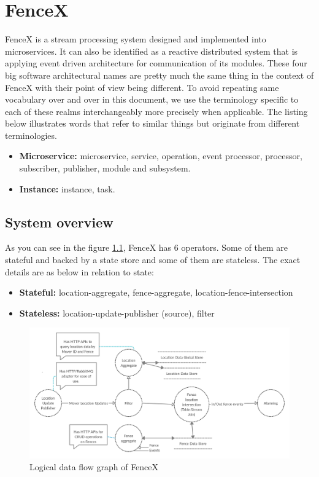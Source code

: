 \documentclass[a4]{report}
\begin{document}
    \chapter{FenceX}
    FenceX is a stream processing system designed and implemented into microservices.
    It can also be identified as a reactive distributed system that is applying event driven architecture for
    communication of its modules.
    These four big software architectural names are pretty much the same thing in the context of FenceX with their
    point of view being different.
    To avoid repeating same vocabulary over and over in this document, we use the terminology specific to each of
    these realms interchangeably more precisely when applicable.
    The listing below illustrates words that refer to similar things but originate from different terminologies.

    \begin{itemize}
        \item \textbf{Microservice:} microservice, service, operation, event processor, processor, subscriber,
        publisher, module and subsystem.
        \item \textbf{Instance:} instance, task.
    \end{itemize}


    \section{System overview}
    As you can see in the figure \ref{fig:logical-dfg}, FenceX has 6 operators.
    Some of them are stateful and backed by a state store and some of them are stateless.
    The exact details are as below in relation to state:

    \begin{itemize}
        \item \textbf{Stateful:} location-aggregate, fence-aggregate, location-fence-intersection
        \item \textbf{Stateless:} location-update-publisher (source), filter
    \end{itemize}

    \begin{figure}[ht]
        \centering
        \caption{Logical data flow graph of FenceX}
        \label{fig:logical-dfg}
        \includegraphics[width=\linewidth ,scale=0.2]{images/logical-data-flow-diagram.png}
    \end{figure}
\end{document}
